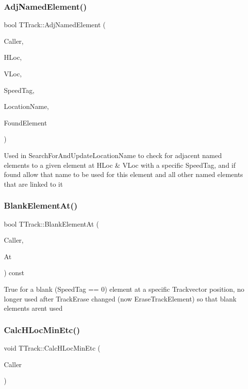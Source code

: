 \subsubsection{\texorpdfstring{Adj\+Named\+Element()}{AdjNamedElement()}}
{\footnotesize\ttfamily bool T\+Track\+::\+Adj\+Named\+Element (\begin{DoxyParamCaption}\item[{int}]{Caller,  }\item[{int}]{H\+Loc,  }\item[{int}]{V\+Loc,  }\item[{int}]{Speed\+Tag,  }\item[{Ansi\+String \&}]{Location\+Name,  }\item[{int \&}]{Found\+Element }\end{DoxyParamCaption})}

Used in Search\+For\+And\+Update\+Location\+Name to check for adjacent named elements to a given element at H\+Loc \& V\+Loc with a specific Speed\+Tag, and if found allow that name to be used for this element and all other named elements that are linked to it \mbox{\label{class_t_track_a928a29de1b2a916a1c829d40b68963e9}} 
\subsubsection{\texorpdfstring{Blank\+Element\+At()}{BlankElementAt()}}
{\footnotesize\ttfamily bool T\+Track\+::\+Blank\+Element\+At (\begin{DoxyParamCaption}\item[{int}]{Caller,  }\item[{int}]{At }\end{DoxyParamCaption}) const}

True for a blank (Speed\+Tag == 0) element at a specific Trackvector position, no longer used after Track\+Erase changed (now Erase\+Track\+Element) so that blank elements aren\textquotesingle{}t used \mbox{\label{class_t_track_a20a28eaf0308f7aedcfc78ba9eeadea9}} 
\subsubsection{\texorpdfstring{Calc\+H\+Loc\+Min\+Etc()}{CalcHLocMinEtc()}}
{\footnotesize\ttfamily void T\+Track\+::\+Calc\+H\+Loc\+Min\+Etc (\begin{DoxyParamCaption}\item[{int}]{Caller }\end{DoxyParamCaption})}

